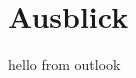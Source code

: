 \documentclass[.../Dokumentation.tex]{subfile}
\begin{document}
    \section{Ausblick}\label{sec-outlook}
    hello from outlook
\end{document}

